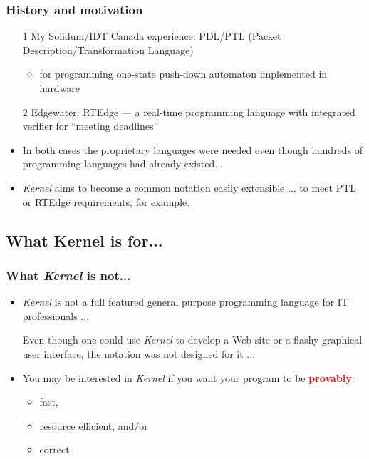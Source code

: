 \documentclass[utf8]{beamer}
\newcommand{\Kernel}{\textit{Kernel}}
\newcommand{\mypause}{\pause}
\begin{document}
\begin{frame}
  \frametitle{History and motivation}
  \begin{itemize}
  \item[1] My Solidum/IDT Canada experience: PDL/PTL (Packet Description/Transformation Language)
    \begin{itemize}
    \item for programming one-state push-down automaton implemented in hardware
    \end{itemize} \mypause
  \item[2] Edgewater: RTEdge --- a real-time programming language
    with integrated verifier for ``meeting deadlines''
    \mypause
  \item In both cases the proprietary languages were needed even
    though hundreds of programming languages had already existed...
    \mypause
  \item \Kernel{} aims to become a common notation easily extensible
    ... to meet PTL or RTEdge requirements, for example.
  \end{itemize}
\end{frame}

\subsection{What Kernel is for...}

\begin{frame}
  \frametitle{What \Kernel{} is not...}
  \begin{itemize}
  \item \Kernel{} is not a full featured general purpose programming
    language for IT professionals ...

    {\small Even though one could use \Kernel{} to develop a Web site or a
    flashy graphical user interface, the notation was not designed for
    it ... }

\mypause
  \item You may be interested in \Kernel{} if you want your program to
    be \textcolor{red}{\bf provably}:
    \begin{itemize}
    \item fast,
    \item resource efficient, and/or
    \item correct.
    \end{itemize}

  \end{itemize}
\end{frame}
\end{document}
